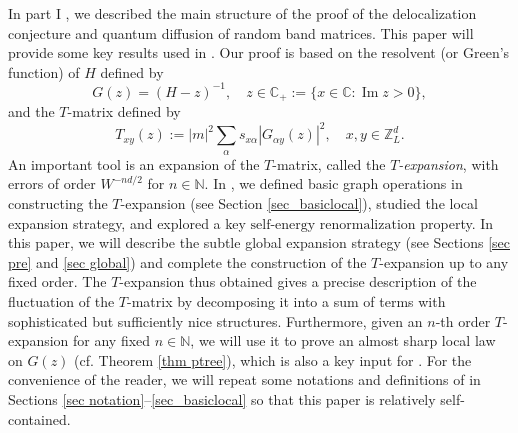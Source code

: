 \documentclass{article}
\newcommand{\1}{\mathds{1}}
\numberwithin{equation}{section}
\newcommand{\al}{\alpha}
\newcommand{\be}{\begin{equation}}
\newcommand{\ee}{\end{equation}}
\newcommand{\C}{\mathbb{C}}
\newcommand{\N}{\mathbb{N}}
\newcommand{\Z}{\mathbb{Z}}
\newcommand{\renormal}{\text{self-energy renormalization}}
\DeclareMathOperator{\im}{Im}
\theoremstyle{plain} %
\theoremstyle{remark}
\newcommand{\cor}{\color{red}}
\newcommand{\hty}[1]{{\cor (ht: #1) }}
\begin{document}
In part I \cite{PartI_high}, we described the main structure of the proof of the delocalization conjecture and quantum diffusion of random band matrices. This paper will provide some key results used in \cite{PartI_high}. Our proof is based on the resolvent (or Green's function) of $H$ defined by 
\be\nonumber
G(z)=(H-z)^{-1},\quad z\in \C_+:=\{x\in \C: \im z>0\},
\ee
and the $T$-matrix defined by \cite{delocal} 
\be\label{defGT}
T_{xy}(z):=|m|^2\sum_\al s_{x\al}|G_{\al y}(z)|^2,\quad x,y \in \Z_L^d.
\ee
An important tool is an expansion of the $T$-matrix, called the \emph{$T$-expansion}, with errors of order $W^{-nd/2}$ for $n\in \N$.
In \cite{PartI_high}, we defined basic graph operations in constructing the $T$-expansion (see Section \ref{sec_basiclocal}), studied the local expansion strategy, and explored a key $\renormal$ property. In this paper, we will describe the subtle global expansion strategy (see Sections \ref{sec pre} and \ref{sec global}) and complete the construction of the $T$-expansion up to any fixed order. %
The $T$-expansion thus obtained gives a precise description of the fluctuation of the $T$-matrix by decomposing it into a sum of terms with sophisticated but sufficiently nice structures. Furthermore, given an $n$-th order $T$-expansion for any fixed $n\in \N$, we will use it to prove an almost sharp local law on $G(z)$ (cf. Theorem \ref{thm ptree}), which is also a key input for \cite{PartI_high}. For the convenience of the reader, we will repeat some notations and definitions of \cite{PartI_high} in Sections \ref{sec notation}--\ref{sec_basiclocal} so that  this paper is relatively self-contained.


%	
%	
%	
%	
%	
\end{document}
